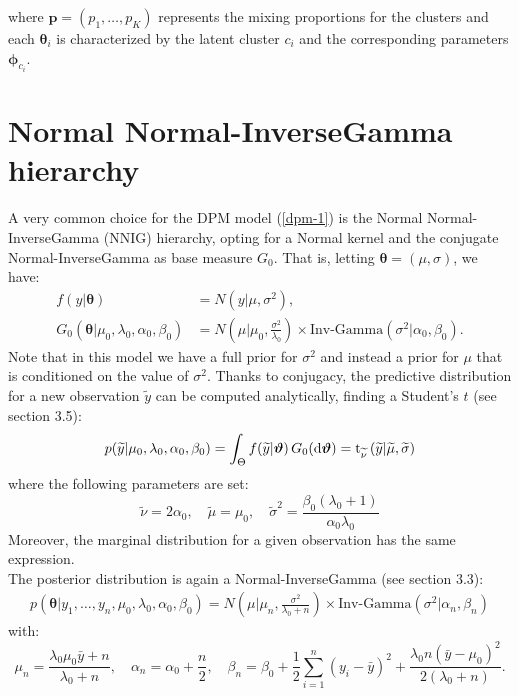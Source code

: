 where $\mathbf{p}=(p_1,\dots,p_K)$ represents the mixing proportions for the clusters and each $\boldsymbol\theta_i$ is characterized by the latent cluster $c_i$ and the corresponding parameters $\boldsymbol\phi_{c_i}$.

\section{Normal Normal-InverseGamma hierarchy} \label{nnig}
A very common choice for the DPM model (\ref{dpm-1}) is the Normal Normal-InverseGamma (NNIG) hierarchy, opting for a Normal kernel and the conjugate Normal-InverseGamma as base measure $G_0$. That is, letting $\boldsymbol\theta=(\mu,\sigma)$, we have:
\begin{equation}
	\begin{aligned}
		f(y|\boldsymbol\theta)&=N(y| \mu ,\sigma^2),  \\
		G_0(\boldsymbol\theta|\mu_0,\lambda_0, \alpha_0, 	\beta_0)
		&=N\left(\mu | \mu_0 ,\frac{\sigma^2} {\lambda_0}\right) \times \text{Inv-Gamma}(\sigma^2|\alpha_0, \beta_0 ).
	\end{aligned}
\end{equation}
Note that in this model we have a full prior for $\sigma^2$ and instead a prior for $\mu$ that is conditioned on the value of $\sigma^2$.
Thanks to conjugacy, the predictive distribution for a new observation $\widetilde{y}$ can be computed analytically, finding a Student's $t$ (see \cite{integral} section 3.5):
\begin{align*}
	p(\widetilde{y}|\mu_0,\lambda_0, \alpha_0, \beta_0) =
	\int_\Theta f(\widetilde{y}|\boldsymbol{\vartheta}) \, G_0(\mathrm d\boldsymbol{\vartheta}) =
	\text{t}_{\widetilde \nu}\left(\widetilde{y}|\widetilde{\mu},\widetilde{\sigma}\right)
\end{align*}
where the following parameters are set:
$$
	\widetilde{\nu}=2 \alpha_0, \quad
	\widetilde{\mu}=\mu_0, \quad
	\widetilde{\sigma}^2= \frac{\beta_0(\lambda_0+1)}{\alpha_0 \lambda_0}
$$
Moreover, the marginal distribution for a given observation has the same expression. \\
The posterior distribution is again a Normal-InverseGamma (see \cite{integral} section 3.3):
\begin{align*}
	p(\boldsymbol\theta|y_1,\dots,y_n,\mu_0,\lambda_0, \alpha_0, \beta_0)=N\left(\mu | \mu_n ,\frac{\sigma^2} {\lambda_0 + n}\right) \times \text{Inv-Gamma}(\sigma^2|\alpha_n, \beta_n )
\end{align*}
with:
$$
\mu_n=\frac{\lambda_0 \mu_0 \bar{y} + n}{\lambda_0 + n}, \quad \alpha_n= \alpha_0 + \frac{n}{2}, \quad \beta_n= \beta_0 + \frac{1}{2}\sum_{i=1}^{n} (y_i-\bar{y})^2 + \frac{\lambda_0 n(\bar{y}-\mu_0)^2}{2(\lambda_0 + n)}.
$$

